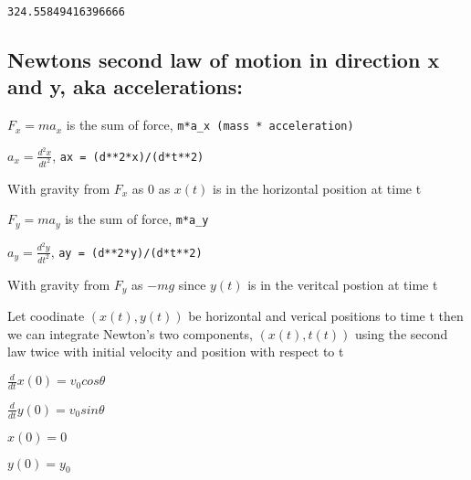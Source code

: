 \documentclass[11pt]{article}
\newcommand{\prompt}[4]{
        \llap{{\color{#2}[#3]: #4}}\vspace{-1.25em}
    }
\begin{document}
            \begin{tcolorbox}[breakable, boxrule=.5pt, size=fbox, pad at break*=1mm, opacityfill=0]
\prompt{Out}{outcolor}{94}{\hspace{3.5pt}}
\begin{Verbatim}[commandchars=\\\{\}]
324.55849416396666
\end{Verbatim}
\end{tcolorbox}
        
    \subsection{Newtons second law of motion in direction x and y, aka
accelerations:}\label{newtons-second-law-of-motion-in-direction-x-and-y-aka-accelerations}

\(F_x = ma_x\) is the sum of force,
\texttt{m*a\_x\ (mass\ *\ acceleration)}

\(a_x = \frac {d^{2}x}{dt^{2}}\), \texttt{ax\ =\ (d**2*x)/(d*t**2)}

With gravity from \(F_x\) as 0 as \(x(t)\) is in the horizontal position
at time t

\(F_y = ma_y\) is the sum of force, \texttt{m*a\_y}

\(a_y = \frac {d^{2}y}{dt^{2}}\), \texttt{ay\ =\ (d**2*y)/(d*t**2)}

With gravity from \(F_y\) as \(-mg\) since \(y(t)\) is in the veritcal
postion at time t

Let coodinate \((x(t), y(t))\) be horizontal and verical positions to
time t then we can integrate Newton's two components, \((x(t), t(t))\)
using the second law twice with initial velocity and position with
respect to t

\(\frac{d}{dt}x(0)=v_0 cos\theta\)

\(\frac{d}{dt}y(0)=v_0 sin\theta\)

\(x(0) = 0\)

\(y(0) = y_0\)
\end{document}
